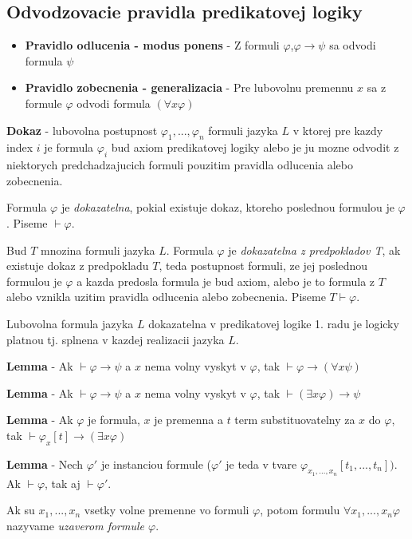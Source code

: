 \documentclass[12pt]{article}
\begin{document}
\subsection{Odvodzovacie pravidla predikatovej logiky}
\begin{itemize}
	\item \textbf{Pravidlo odlucenia - modus ponens} - Z formuli $\varphi$,$\varphi \to \psi$
		sa odvodi formula $\psi$
	\item \textbf{Pravidlo zobecnenia - generalizacia} - Pre lubovolnu premennu $x$ sa z formule
		$\varphi$ odvodi formula $(\forall x \varphi)$
\end{itemize}

\textbf{Dokaz} - lubovolna postupnost $\varphi_{1},...,\varphi_{n}$ formuli jazyka $L$ v ktorej
pre kazdy index $i$ je formula $\varphi_{i}$ bud axiom predikatovej logiky alebo je ju mozne
odvodit z niektorych predchadzajucich formuli pouzitim pravidla odlucenia alebo zobecnenia.

Formula $\varphi$ je \emph{dokazatelna}, pokial existuje dokaz, ktoreho poslednou formulou je
$\varphi$. Piseme $\vdash \varphi$.

Bud $T$ mnozina formuli jazyka $L$. Formula $\varphi$ je \emph{dokazatelna z predpokladov T}, ak
existuje dokaz z predpokladu $T$, teda postupnost formuli, ze jej poslednou formulou je $\varphi$
a kazda predosla formula je bud axiom, alebo je to formula z $T$ alebo vznikla uzitim pravidla
odlucenia alebo zobecnenia. Piseme $T \vdash \varphi$.

Lubovolna formula jazyka $L$ dokazatelna v predikatovej logike 1. radu je logicky platnou tj.
splnena v kazdej realizacii jazyka $L$.

\textbf{Lemma} - Ak $\vdash \varphi \to \psi$ a $x$ nema volny vyskyt v $\varphi$, tak
$\vdash \varphi \to (\forall x \psi)$

\textbf{Lemma} - Ak $\vdash \varphi \to \psi$ a $x$ nema volny vyskyt v $\varphi$, tak
$\vdash (\exists x \varphi) \to \psi$

\textbf{Lemma} - Ak $\varphi$ je formula, $x$ je premenna a $t$ term substituovatelny za $x$
do $\varphi$, tak $\vdash \varphi_{x}[t] \to (\exists x \varphi)$

\textbf{Lemma} - Nech $\varphi'$ je instanciou formule ($\varphi'$ je teda v tvare
$\varphi_{x_{1},...,x_{n}}[t_{1},...,t_{n}])$. Ak $\vdash \varphi$, tak aj $\vdash \varphi'$.

Ak su $x_{1},...,x_{n}$ vsetky volne premenne vo formuli $\varphi$, potom formulu
$\forall x_{1},...,x_{n} \varphi$ nazyvame \emph{uzaverom formule $\varphi$}.
\end{document}
